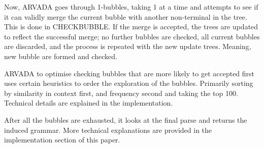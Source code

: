 Now, ARVADA goes through 1-bubbles, taking 1 at a time and attempts to see if it can validly merge the current bubble with another non-terminal in the tree. This is done in CHECKBUBBLE. If the merge is accepted, the trees are updated to reflect the successful merge; no further bubbles are checked, all current bubbles are discarded, and the process is repeated with the new update trees. Meaning, new bubble are formed and checked. 

\vspace{\baselineskip}
ARVADA to optimise checking bubbles that are more likely to get accepted first uses certain heuristics to order the exploration of the bubbles. Primarily sorting by similarity in context first, and frequency second and taking the top 100. Technical details are explained in the implementation.

\vspace{\baselineskip}
After all the bubbles are exhausted, it looks at the final parse and returns the induced grammar. More technical explanations are provided in the implementation section of this paper.


